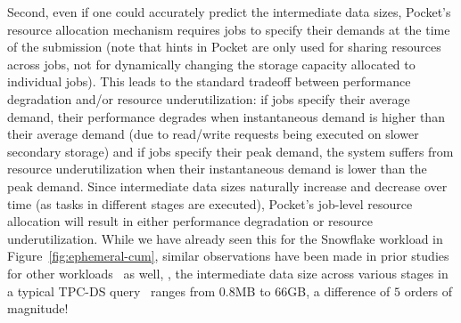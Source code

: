 Second, even if one could accurately predict the intermediate data sizes, Pocket's resource allocation mechanism requires jobs to specify their demands at the time of the submission (note that hints in Pocket are only used for sharing resources across jobs, not for dynamically changing the storage capacity allocated to individual jobs). This leads to the standard tradeoff between performance degradation and/or resource underutilization: if jobs specify their average demand, their performance degrades when instantaneous demand is higher than their average demand (due to read/write requests being executed on slower secondary storage) and if jobs specify their peak demand, the system suffers from resource underutilization when their instantaneous demand is lower than the peak demand. Since intermediate data sizes naturally increase and decrease over time (as tasks in different stages are executed), Pocket's job-level resource allocation will result in either performance degradation or resource underutilization. While we have already seen this for the Snowflake workload in Figure~\ref{fig:ephemeral-cum}, similar observations have been made in prior studies for other workloads~\cite{locus, googletrace} as well, \eg, the intermediate data size across various stages in a typical TPC-DS query~\cite{tpcds} ranges from $0.8$MB to $66$GB, a difference of $5$ orders of magnitude!  


